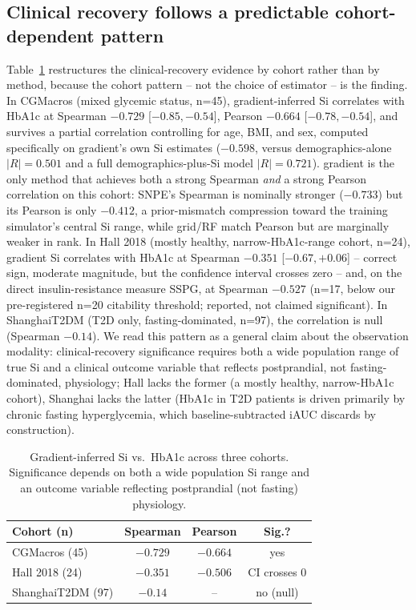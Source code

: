 \documentclass[letterpaper]{article} %
\begin{document}
\subsection{Clinical recovery follows a predictable cohort-dependent pattern}
Table~\ref{tab:clinical} restructures the clinical-recovery evidence by cohort rather than by
method, because the cohort pattern -- not the choice of estimator -- is the finding. In CGMacros
(mixed glycemic status, n=45), gradient-inferred Si correlates with HbA1c at Spearman
$-0.729$ [$-0.85,-0.54$], Pearson $-0.664$ [$-0.78,-0.54$], and survives a partial correlation
controlling for age, BMI, and sex, computed specifically on gradient's own Si estimates
($-0.598$, versus demographics-alone $|R|=0.501$ and a full demographics-plus-Si model
$|R|=0.721$). gradient is the
only method that achieves both a strong Spearman \emph{and} a strong Pearson correlation on this
cohort: SNPE's Spearman is nominally stronger ($-0.733$) but its Pearson is only $-0.412$, a
prior-mismatch compression toward the training simulator's central Si range, while grid/RF match
Pearson but are marginally weaker in rank. In Hall 2018 (mostly healthy, narrow-HbA1c-range
cohort, n=24), gradient Si correlates with HbA1c at Spearman $-0.351$ [$-0.67,+0.06$] -- correct
sign, moderate magnitude, but the confidence interval crosses zero -- and, on the direct
insulin-resistance measure SSPG, at Spearman $-0.527$ (n=17, below our pre-registered n=20
citability threshold; reported, not claimed significant). In ShanghaiT2DM (T2D only,
fasting-dominated, n=97), the correlation is null (Spearman $-0.14$). We read this pattern as a
general claim about the observation modality: clinical-recovery significance requires both a wide
population range of true Si and a clinical outcome variable that reflects postprandial, not
fasting-dominated, physiology; Hall lacks the former (a mostly healthy, narrow-HbA1c cohort),
Shanghai lacks the latter (HbA1c in T2D patients is driven primarily by chronic fasting
hyperglycemia, which baseline-subtracted iAUC discards by construction).

\begin{table}[t]
\centering\small
\begin{tabular}{@{}lccc@{}}
\toprule
Cohort (n) & Spearman & Pearson & Sig.? \\
\midrule
CGMacros (45) & $-0.729$ & $-0.664$ & yes \\
Hall 2018 (24) & $-0.351$ & $-0.506$ & CI crosses 0 \\
ShanghaiT2DM (97) & $-0.14$ & -- & no (null) \\
\bottomrule
\end{tabular}
\caption{Gradient-inferred Si vs.\ HbA1c across three cohorts. Significance depends on both a wide
population Si range and an outcome variable reflecting postprandial (not fasting) physiology.}
\label{tab:clinical}
\end{table}
\end{document}

